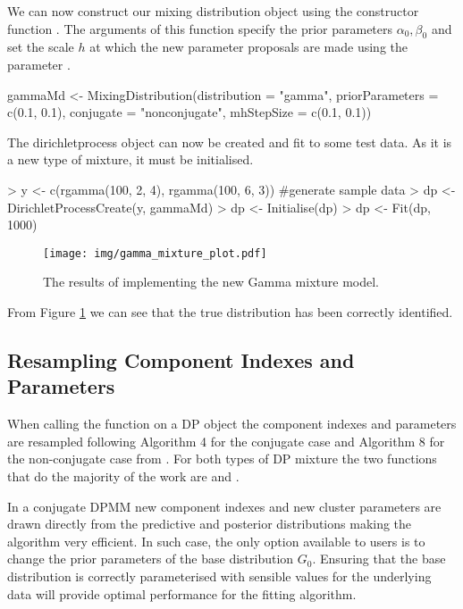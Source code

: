 \documentclass[nojss]{jss}
\begin{document}
We can now construct our mixing distribution object using the constructor function . The arguments of this function specify the prior parameters $\alpha _0, \beta _0$ and set the scale $h$ at which the new parameter proposals are made using the parameter .
\begin{CodeInput}
gammaMd <- MixingDistribution(distribution = "gamma",
                              priorParameters = c(0.1, 0.1),
                              conjugate = "nonconjugate",
                              mhStepSize = c(0.1, 0.1))
\end{CodeInput}

The dirichletprocess object can now be created and fit to some test data. As it is a new type of mixture, it must be initialised.
\begin{Schunk}
\begin{Sinput}
> y <- c(rgamma(100, 2, 4), rgamma(100, 6, 3)) #generate sample data
> dp <- DirichletProcessCreate(y, gammaMd)
> dp <- Initialise(dp)
> dp <- Fit(dp, 1000)
\end{Sinput}
\end{Schunk}
\begin{figure}[tb]
\centering
	\texttt{[image: img/gamma\_mixture\_plot.pdf]}
\caption{The results of implementing the new Gamma mixture model.}
\label{fig:gammamixture}
\end{figure}
From Figure \ref{fig:gammamixture} we can see that the true distribution has been correctly identified.

\subsection{Resampling Component Indexes and Parameters}
When calling the  function on a DP object the component indexes and parameters are resampled following Algorithm 4 for the conjugate case and Algorithm 8 for the non-conjugate case from \cite{neal_markov_2000}. For both types of DP mixture the two functions that do the majority of the work are  and .

In a conjugate DPMM new component indexes and new cluster parameters are drawn directly from the predictive and posterior distributions making the algorithm very efficient. In such case, the only option available to users is to change the prior parameters of the base distribution $G_0$. Ensuring that the base distribution is correctly parameterised with sensible values for the underlying data will provide optimal performance for the fitting algorithm.
\end{document}
